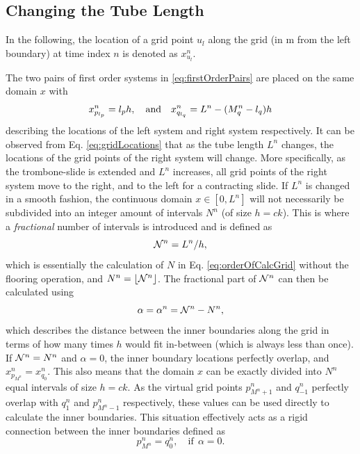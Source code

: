 \subsection{Changing the Tube Length}
In the following, the location of a grid point $u_l$ along the grid (in m from the left boundary) at time index $n$ is denoted as $x_{u_l}^n$.

The two pairs of first order systems in \eqref{eq:firstOrderPairs} are placed on the same domain $x$ with
\begin{equation}\label{eq:gridLocations}
    x_{p_{l_p}}^n = {l_p} h, \quad \text{and}\quad
    x_{q_{l_q}}^n = L^n-(M_q^n - {l_q})h
\end{equation}
describing the locations of the left system and right system respectively. It can be observed from Eq. \eqref{eq:gridLocations} that as the tube length $L^n$ changes, the locations of the grid points of the right system will change. More specifically, as the trombone-slide is extended and $L^n$ increases, all grid points of the right system move to the right, and to the left for a contracting slide. If $L^n$ is changed in a smooth fashion, the continuous domain $x \in [0,L^n]$ will not necessarily be subdivided into an integer amount of intervals $N^n$ (of size $h = ck$). This is where a \textit{fractional} number of intervals is introduced and is defined as 
\begin{equation}\label{eq:nfrac}
    \mathcal{N}^n = L^n/h,
\end{equation}
which is essentially the calculation of $N$ in Eq. \eqref{eq:orderOfCalcGrid} without the flooring operation, and $N^n = \lfloor \mathcal{N}^n \rfloor$. The fractional part of $\mathcal{N}^n$ can then be calculated using
\begin{equation}\label{eq:alphaDef}
    \alpha = \alpha^n = \mathcal{N}^n - N^n,
\end{equation}
which describes the distance between the inner boundaries along the grid in terms of how many times $h$ would fit in-between (which is always less than once). If $\mathcal{N}^n = N^n$ and $\alpha = 0$, the inner boundary locations perfectly overlap, and $x_{p_{M^n}}^n = x_{q_0}^n$. This also means that the domain $x$ can be exactly divided into $N^n$ equal intervals of size $h = ck$. As the virtual grid points $p_{M^n+1}^n$ and $q_{-1}^n$ perfectly overlap with $q_{1}^n$ and $p_{M^n-1}^n$ respectively, these values can be used directly to calculate the inner boundaries. This situation effectively acts as a rigid connection between the inner boundaries defined as
\begin{equation}\label{eq:rigidConn}
    p_{M^n}^n = q_0^n, \quad \text{if} \ \  \alpha = 0.
\end{equation}
